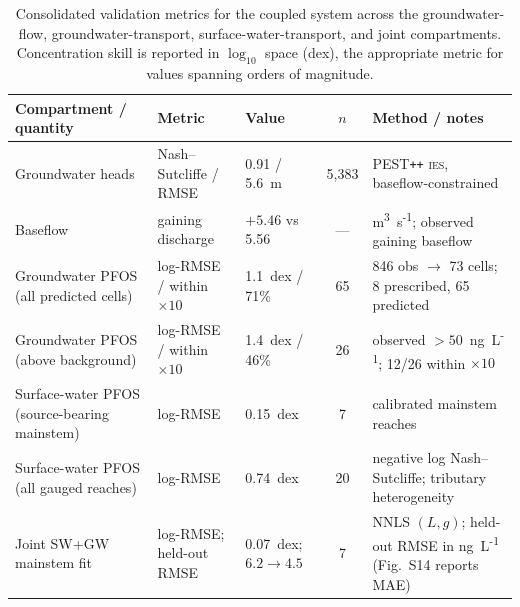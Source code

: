 \begin{table}[t]
  \centering
  \footnotesize
  \caption{Consolidated validation metrics for the coupled system across the
  groundwater-flow, groundwater-transport, surface-water-transport, and joint
  compartments. Concentration skill is reported in $\log_{10}$ space (dex), the
  appropriate metric for values spanning orders of magnitude.}
  \label{tab:validation}
  \begin{tabularx}{\linewidth}{@{}>{\raggedright\arraybackslash}p{3.0cm}llcX@{}}
    \toprule
    Compartment / quantity & Metric & Value & $n$ & Method / notes \\
    \midrule
    Groundwater heads
      & Nash--Sutcliffe / RMSE & 0.91 / 5.6~m & 5{,}383
      & PEST\texttt{++} \textsc{ies}, baseflow-constrained \\
    Baseflow
      & gaining discharge & $+5.46$ vs 5.56 & ---
      & m\textsuperscript{3}~s\textsuperscript{-1}; observed gaining baseflow \\
    Groundwater PFOS (all predicted cells)
      & log-RMSE / within $\times10$ & 1.1~dex / 71\% & 65
      & 846 obs $\to$ 73 cells; 8 prescribed, 65 predicted \\
    Groundwater PFOS (above background)
      & log-RMSE / within $\times10$ & 1.4~dex / 46\% & 26
      & observed $>50$~ng~L\textsuperscript{-1}; 12/26 within $\times10$ \\
    Surface-water PFOS (source-bearing mainstem)
      & log-RMSE & 0.15~dex & 7
      & calibrated mainstem reaches \\
    Surface-water PFOS (all gauged reaches)
      & log-RMSE & 0.74~dex & 20
      & negative log Nash--Sutcliffe; tributary heterogeneity \\
    Joint SW+GW mainstem fit
      & log-RMSE; held-out RMSE & 0.07~dex; $6.2\!\to\!4.5$ & 7
      & NNLS $(L,g)$; held-out RMSE in ng~L\textsuperscript{-1} (Fig.~S14 reports MAE) \\
    \bottomrule
  \end{tabularx}
\end{table}

